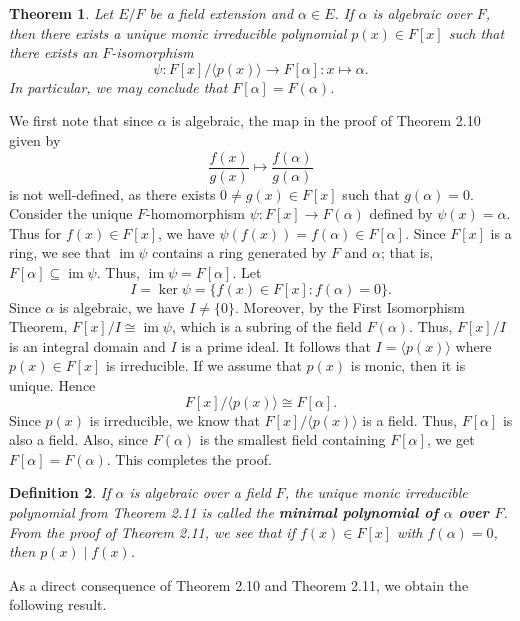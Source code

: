 \documentclass[10pt]{article}
\makeatletter
\DeclareMathOperator{\im}{im}
\theoremstyle{newstyle}
\newtheorem{thm}{Theorem}[section]
\newtheorem{defn}[thm]{Definition}
\newenvironment{pf}[1][\proofname]{\par
  \pushQED{\qed}%
  \normalfont \topsep0\p@\relax
  \trivlist
  \item[\hskip\labelsep\scshape
  #1\@addpunct{.}]\ignorespaces
}{%
  \popQED\endtrivlist\@endpefalse
}
\makeatother
\begin{document}
\begin{thm}
Let $E/F$ be a field extension and $\alpha \in E$. If $\alpha$ is algebraic over $F$, 
then there exists a unique monic irreducible polynomial $p(x) \in F[x]$ such that there exists
an $F$-isomorphism 
\[ \psi : F[x]/\langle p(x) \rangle \to F[\alpha] : x \mapsto \alpha. \]
In particular, we may conclude that $F[\alpha] = F(\alpha)$.
\end{thm}
\begin{pf}
We first note that since $\alpha$ is algebraic, the map in the proof of Theorem 2.10 given by 
\[ \frac{f(x)}{g(x)} \mapsto \frac{f(\alpha)}{g(\alpha)} \] 
is not well-defined, as there exists $0 \neq g(x) \in F[x]$ such that $g(\alpha) = 0$. 
Consider the unique $F$-homomorphism $\psi : F[x] \to F(\alpha)$ defined by 
$\psi(x) = \alpha$. Thus for $f(x) \in F[x]$, we have 
$\psi(f(x)) = f(\alpha) \in F[\alpha]$. Since $F[x]$ is a ring, we see that 
$\im\psi$ contains a ring generated by $F$ and $\alpha$; that is, 
$F[\alpha] \subseteq \im\psi$. Thus, $\im\psi = F[\alpha]$. Let 
\[ I = \ker\psi = \{f(x) \in F[x] : f(\alpha) = 0\}. \] 
Since $\alpha$ is algebraic, we have $I \neq \{0\}$. Moreover, by the First Isomorphism 
Theorem, $F[x]/I \cong \im\psi$, which is a subring of the field $F(\alpha)$. Thus, 
$F[x]/I$ is an integral domain and $I$ is a prime ideal. It follows that 
$I = \langle p(x) \rangle$ where $p(x) \in F[x]$ is irreducible. If we assume that $p(x)$ 
is monic, then it is unique. Hence 
\[ F[x]/\langle p(x) \rangle \cong F[\alpha]. \] 
Since $p(x)$ is irreducible, we know that $F[x]/\langle p(x) \rangle$ is a field. 
Thus, $F[\alpha]$ is also a field. Also, since $F(\alpha)$ is the smallest field 
containing $F[\alpha]$, we get $F[\alpha] = F(\alpha)$. This completes the proof.
\end{pf}

\begin{defn}
If $\alpha$ is algebraic over a field $F$, the unique monic irreducible polynomial from 
Theorem 2.11 is called the {\bf minimal polynomial of $\alpha$ over $F$}. 
From the proof of Theorem 2.11, we see that if $f(x) \in F[x]$ with $f(\alpha) = 0$, then 
$p(x) \mid f(x)$. 
\end{defn}

As a direct consequence of Theorem 2.10 and Theorem 2.11, we obtain the following result. 
\end{document}
